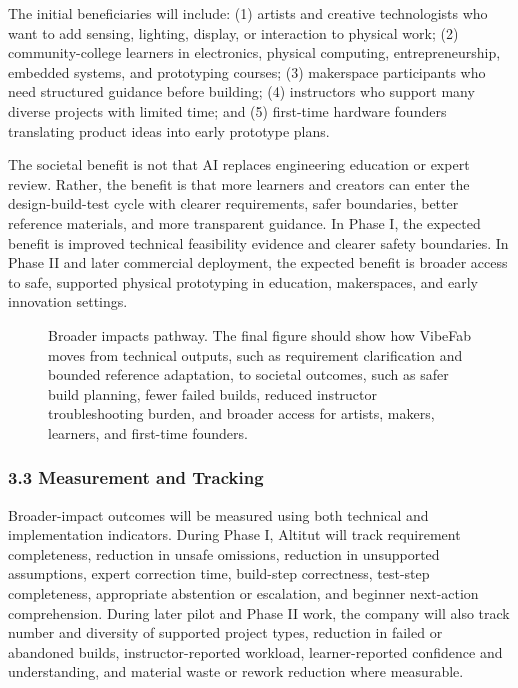 The initial beneficiaries will include: 
(1) artists and creative technologists who want to add sensing, lighting, display, or interaction to physical work; 
(2) community-college learners in electronics, physical computing, entrepreneurship, embedded systems, and prototyping courses; 
(3) makerspace participants who need structured guidance before building; 
(4) instructors who support many diverse projects with limited time; and 
(5) first-time hardware founders translating product ideas into early prototype plans.

The societal benefit is not that AI replaces engineering education or expert review. Rather, the benefit is that more learners and creators can enter the design-build-test cycle with clearer requirements, safer boundaries, better reference materials, and more transparent guidance. In Phase I, the expected benefit is improved technical feasibility evidence and clearer safety boundaries. In Phase II and later commercial deployment, the expected benefit is broader access to safe, supported physical prototyping in education, makerspaces, and early innovation settings.

\begin{figure}[H]
\centering
{}
\caption{Broader impacts pathway. The final figure should show how VibeFab moves from technical outputs, such as requirement clarification and bounded reference adaptation, to societal outcomes, such as safer build planning, fewer failed builds, reduced instructor troubleshooting burden, and broader access for artists, makers, learners, and first-time founders.}
\label{fig:broader_impacts_tracking}
\end{figure}

\subsubsection*{3.3 Measurement and Tracking}

Broader-impact outcomes will be measured using both technical and implementation indicators. During Phase I, Altitut will track requirement completeness, reduction in unsafe omissions, reduction in unsupported assumptions, expert correction time, build-step correctness, test-step completeness, appropriate abstention or escalation, and beginner next-action comprehension. During later pilot and Phase II work, the company will also track number and diversity of supported project types, reduction in failed or abandoned builds, instructor-reported workload, learner-reported confidence and understanding, and material waste or rework reduction where measurable.

